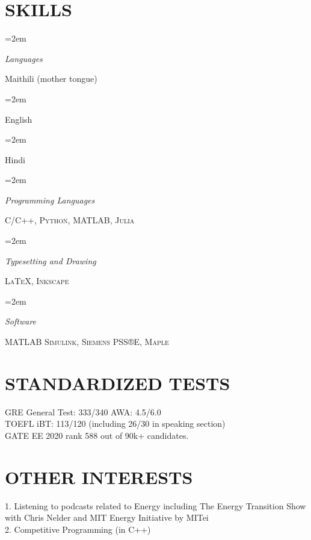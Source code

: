 \documentclass[paper=a4,fontsize=11pt]{scrartcl} %
\newlength{\spacebox}
\newcommand{\sepspace}{\vspace*{1em}}		%
\newcommand{\NewPart}[1]{\section*{\uppercase{#1}}}
\newcommand{\PersonalEntry}[2]{
		\noindent\hangindent=2em\hangafter=0 %
		\parbox{\spacebox}{        %
		\textit{#1}}		       %
		\hspace{1.5em} #2 \par}    %
\newcommand{\SkillsEntry}[2]{      %
		\noindent\hangindent=2em\hangafter=0 %
		\parbox{\spacebox}{        %
		\textit{#1}}			   %
		\hspace{1.5em} #2 \par}    %
\begin{document}
\NewPart{Skills}{}

\SkillsEntry{Languages}{Maithili (mother tongue)}
\SkillsEntry{}{English}
\SkillsEntry{}{Hindi}
\sepspace

\SkillsEntry{Programming Languages}{\textsc{C/C++}, \textsc{Python}, \textsc{MATLAB}, \textsc{Julia}}
\sepspace

\SkillsEntry{Typesetting and Drawing}{\textsc{\LaTeX}, \textsc{Inkscape}}
\sepspace

\SkillsEntry{Software}{\textsc{MATLAB Simulink}, \textsc{Siemens PSS®E}, \textsc{Maple}}
\sepspace

\NewPart{Standardized Tests}{}

GRE General Test: 333/340 AWA: 4.5/6.0 \\
TOEFL iBT: 113/120 (including 26/30 in speaking section) \\
GATE EE 2020 rank 588 out of 90k+ candidates.

\NewPart{Other Interests}{}
1. Listening to podcasts related to Energy including The Energy Transition Show with Chris Nelder and MIT Energy Initiative by MITei
\\
\sepspace
2. Competitive Programming (in C++)
\end{document}
